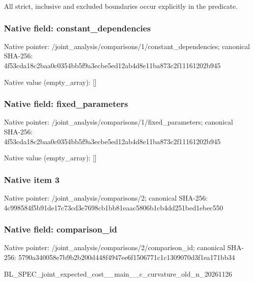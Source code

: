 \documentclass[10pt,a4paper]{article}
\begin{document}
All strict, inclusive and excluded boundaries occur explicitly in the predicate.


\subsubsection{Native field: constant\_dependencies}


Native pointer: /joint\_analysis/comparis\allowbreak{}ons/1/constant\_dependenc\allowbreak{}ies; canonical SHA-256: 4f53cda18c2baa0c0354bb5f\allowbreak{}9a3ecbe5ed12ab4d8e11ba87\allowbreak{}3c2f11161202b945



Native value (empty\_array): []



\subsubsection{Native field: fixed\_parameters}


Native pointer: /joint\_analysis/comparis\allowbreak{}ons/1/fixed\_parameters; canonical SHA-256: 4f53cda18c2baa0c0354bb5f\allowbreak{}9a3ecbe5ed12ab4d8e11ba87\allowbreak{}3c2f11161202b945



Native value (empty\_array): []



\subsubsection{Native item 3}


Native pointer: /joint\_analysis/comparisons/2; canonical SHA-256: 4c998584f5b91de17c73cd3e\allowbreak{}7698cb1bb81eaac5806b1cb4\allowbreak{}dd251bed1ebec550



\subsubsection{Native field: comparison\_id}


Native pointer: /joint\_analysis/comparis\allowbreak{}ons/2/comparison\_id; canonical SHA-256: 5790a340058e7b9b2b200d44\allowbreak{}8f4947ee6f1506771c1c1309\allowbreak{}070d3f1ea171bb34


BL\_SPEC\_joint\_expected\_c\allowbreak{}ost\_\_main\_\_c\_curvature\_o\allowbreak{}ld\_n\_20261126
\end{document}
